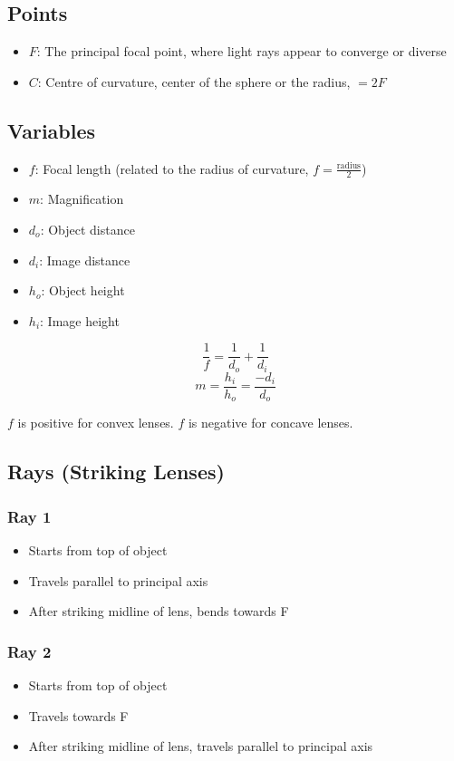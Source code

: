 \documentclass[a4paper,12pt]{article}
\begin{document}
\subsection{Points}
\begin{itemize}
    \item{$F$: The principal focal point, where light rays appear to converge or diverse}
    \item{$C$: Centre of curvature, center of the sphere or the radius, $= 2F$}
\end{itemize}

\subsection{Variables}
\begin{itemize}
    \item{$f$: Focal length (related to the radius of curvature, $f = \frac{\textrm{radius}}{2}$)}
    \item{$m$: Magnification}
    \item{$d_o$: Object distance}
    \item{$d_i$: Image distance}
    \item{$h_o$: Object height}
    \item{$h_i$: Image height}
\end{itemize}

$$\frac{1}{f} = \frac{1}{d_o} + \frac{1}{d_i}$$
$$m = \frac{h_i}{h_o} = \frac{-d_i}{d_o}$$

$f$ is positive for convex lenses.
$f$ is negative for concave lenses.

\subsection{Rays (Striking Lenses)}
\subsubsection{Ray 1}
\begin{itemize}
    \item{Starts from top of object}
    \item{Travels parallel to principal axis}
    \item{After striking midline of lens, bends towards F}
\end{itemize}

\subsubsection{Ray 2}
\begin{itemize}
    \item{Starts from top of object}
    \item{Travels towards F}
    \item{After striking midline of lens, travels parallel to principal axis}
\end{itemize}
\end{document}
